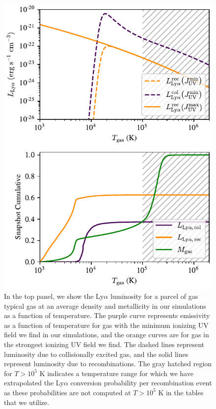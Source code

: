 \begin{figure}
  \centering
    \includegraphics[width=\textwidth,height=\textheight,keepaspectratio]{figures/luminosity_vs_temperature.pdf}
  \caption{
    In the top panel, we show the Ly$\alpha$ luminosity for a parcel of gas typical gas at an average density and metallicity in our simulations as a function of temperature.
    The purple curve represents emissivity as a function of temperature for gas with the minimum ionizing UV field we find in our simulations, and the orange curves are for gas in the strongest ionizing UV field we find.
    The dashed lines represent luminosity due to collisionally excited gas, and the solid lines represent luminosity due to recombinations.
    The gray hatched region for $T > 10^5$ K indicates a temperature range for which we have extrapolated the Ly$\alpha$ conversion probability per recombination event as these probabilities are not computed at $T>10^5$ K in the \citet{Pengelly1964} tables that we utilize.
  }
  \label{fig:luminosity_vs_temperature}
\end{figure}


